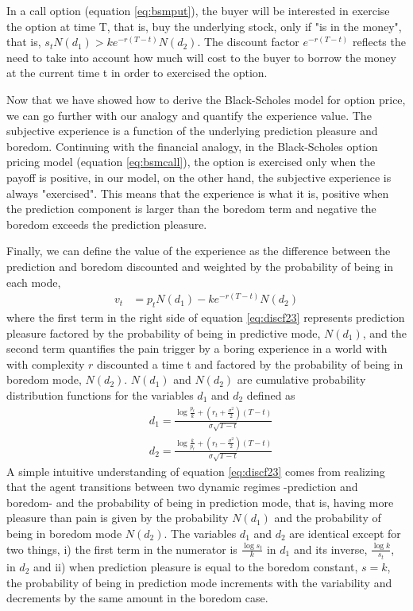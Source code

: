 \documentclass[11pt,twocolumn]{article}
\begin{document}
In a call option (equation \ref{eq:bsmput}), the buyer will be interested in exercise the option at time T, that is, buy the underlying stock, only if "is in the money", that is, $s_t N(d_1) > k e^{-r(T-t)}N(d_2)$. The discount factor $e^{-r(T-t)}$ reflects the need to take into account how much will cost to the buyer to borrow the money at the current time t in order to exercised the option. 

Now that we have showed how to derive the Black-Scholes model for option price, we can go further with our analogy and quantify the experience value. The subjective experience is a function of the underlying prediction pleasure and boredom. Continuing with the financial analogy, in the Black-Scholes option pricing model (equation \ref{eq:bsmcall}), the option is exercised only when the payoff is positive, in our model, on the other hand, the subjective experience is always "exercised". This means that the experience is what it is, positive when the prediction component is larger than the boredom term and negative the boredom exceeds the prediction pleasure. 

Finally, we can define the value of the experience as the difference between the prediction and boredom discounted and weighted by the probability of being in each mode,
\begin{equation}
\begin{split}
    v_t  & =  p_{t}N(d_1) - k e^{-r(T-t)}N(d_2)
\end{split}
\label{eq:discf23}
\end{equation}
where the first term in the right side of equation \ref{eq:discf23} represents prediction pleasure  factored by the probability of being in predictive mode, $N(d_1)$, and the second term quantifies the pain trigger by a boring experience in a world with with complexity $r$ discounted a time t and factored by the probability  of being in boredom mode, $N(d_2)$. $N(d_1)$ and $N(d_2)$ are cumulative probability distribution functions for the variables $d_1$ and $d_2$ defined as 
\begin{equation}
\begin{split}
    & d_1 = \frac{\log \frac{p_t}{k}  + (r_t + \frac{\sigma ^2}{2})(T-t)}{\sigma \sqrt{T-t}}  \\
    & d_2 = \frac{\log \frac{k}{p_t}  + (r_t - \frac{\sigma ^2}{2})(T-t)}{\sigma \sqrt{T-t}} 
\end{split}
\label{eq:discf2}
\end{equation}
A simple intuitive understanding of equation \ref{eq:discf23} comes from realizing that the agent transitions between two dynamic regimes -prediction and boredom- and the probability of being in prediction mode, that is, having more pleasure than pain is given by the probability $N(d_1)$ and the probability of being in boredom mode $N(d_2)$.
The variables $d_1$ and $d_2$ are identical except for two things, i) the first term in the numerator is $\frac{\log{s_t}}{k}$ in $d_1$ and its inverse, $\frac{\log k}{s_t}$, in $d_2$ and ii) when prediction pleasure is equal to the boredom constant, $s = k$, the probability of being in prediction mode increments with the variability and decrements by the same amount in the boredom case. 
\end{document}

